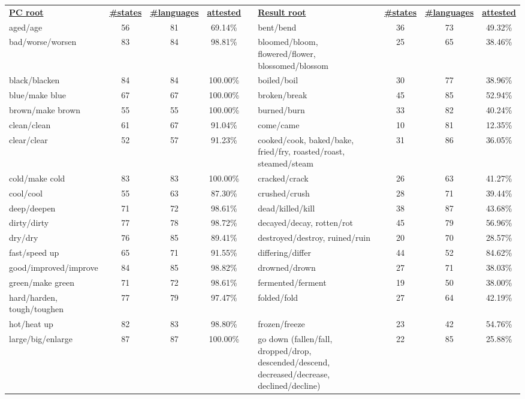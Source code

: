 \begin{tabular}{p{3cm}ccccp{3cm}ccc}
\underline{\textbf{PC root}} & \underline{\textbf{\#states}} & \underline{\textbf{\#languages}} & \underline{\textbf{attested}} & & \underline{\textbf{Result root}} & \underline{\textbf{\#states}} & \underline{\textbf{\#languages}} & \underline{\textbf{attested}} \\
aged/age & 56 & 81 & 69.14\% & & bent/bend & 36 & 73 & 49.32\% \\
bad/worse/worsen & 83 & 84 & 98.81\% & & bloomed/bloom, flowered/flower, blossomed/blossom & 25 & 65 & 38.46\% \\
black/blacken & 84 & 84 & 100.00\% & & boiled/boil & 30 & 77 & 38.96\% \\
blue/make blue & 67 & 67 & 100.00\% & & broken/break & 45 & 85 & 52.94\% \\
brown/make brown & 55 & 55 & 100.00\% & & burned/burn & 33 & 82 & 40.24\% \\
clean/clean & 61 & 67 & 91.04\% & & come/came & 10 & 81 & 12.35\% \\
clear/clear & 52 & 57 & 91.23\% & & cooked/cook, baked/bake, fried/fry, roasted/roast, steamed/steam & 31 & 86 & 36.05\% \\
cold/make cold & 83 & 83 & 100.00\% & & cracked/crack & 26 & 63 & 41.27\% \\
cool/cool & 55 & 63 & 87.30\% & & crushed/crush & 28 & 71 & 39.44\% \\
deep/deepen & 71 & 72 & 98.61\% & & dead/killed/kill & 38 & 87 & 43.68\% \\
dirty/dirty & 77 & 78 & 98.72\% & & decayed/decay, rotten/rot & 45 & 79 & 56.96\% \\
dry/dry & 76 & 85 & 89.41\% & & destroyed/destroy, ruined/ruin & 20 & 70 & 28.57\% \\
fast/speed up & 65 & 71 & 91.55\% & & differing/differ & 44 & 52 & 84.62\% \\
good/improved/improve & 84 & 85 & 98.82\% & & drowned/drown & 27 & 71 & 38.03\% \\
green/make green & 71 & 72 & 98.61\% & & fermented/ferment & 19 & 50 & 38.00\% \\
hard/harden, tough/toughen & 77 & 79 & 97.47\% & & folded/fold & 27 & 64 & 42.19\% \\
hot/heat up & 82 & 83 & 98.80\% & & frozen/freeze & 23 & 42 & 54.76\% \\
large/big/enlarge & 87 & 87 & 100.00\% & & go down (fallen/fall, dropped/drop, descended/descend, decreased/decrease, declined/decline) & 22 & 85 & 25.88\% \\

\end{tabular}
